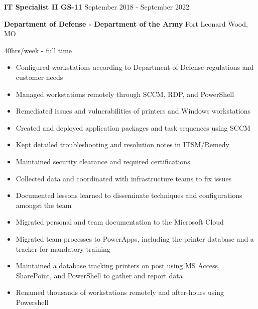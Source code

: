 \documentclass[../main.tex]{subfiles}
\begin{document}
    \textbf{IT Specialist II GS-11}
    \hfill
    September 2018 - September 2022
    
    \textbf{Department of Defense - Department of the Army}
    \hfill
    Fort Leonard Wood, MO
    
    \hfill
    40hrs/week - full time
    \begin{itemize}
        \item Configured workstations according to Department of Defense regulations and customer needs
        \item Managed workstations remotely through SCCM, RDP, and PowerShell
        \item Remediated issues and vulnerabilities of printers and Windows workstations
        \item Created and deployed application packages and task sequences using SCCM
        \item Kept detailed troubleshooting and resolution notes in ITSM/Remedy
        \item Maintained security clearance and required certifications
        \item Collected data and coordinated with infrastructure teams to fix issues
        \item Documented lessons learned to disseminate techniques and configurations amongst the team
        \item Migrated personal and team documentation to the Microsoft Cloud
        \item Migrated team processes to PowerApps, including the printer database and a tracker for mandatory training
        \item Maintained a database tracking printers on post using MS Access, SharePoint, and PowerShell to gather and report data
        \item Renamed thousands of workstations remotely and after-hours using Powershell
    \end{itemize}
\end{document}
